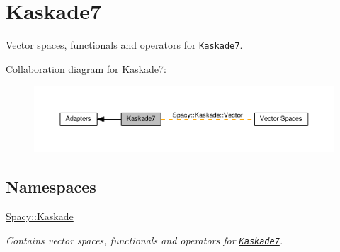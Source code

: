 \hypertarget{group__KaskadeGroup}{}\section{Kaskade7}
\label{group__KaskadeGroup}


Vector spaces, functionals and operators for \href{http://www.zib.de/projects/kaskade7-finite-element-toolbox}{\tt Kaskade7}.  


Collaboration diagram for Kaskade7\+:
\nopagebreak
\begin{figure}[H]
\begin{center}
\leavevmode
\includegraphics[width=350pt]{group__KaskadeGroup}
\end{center}
\end{figure}
\subsection*{Namespaces}
\begin{DoxyCompactItemize}
\item 
 \hyperlink{namespaceSpacy_1_1Kaskade}{Spacy\+::\+Kaskade}
\begin{DoxyCompactList}\small\item\em Contains vector spaces, functionals and operators for \href{http://www.zib.de/projects/kaskade7-finite-element-toolbox}{\tt Kaskade7}. \end{DoxyCompactList}\end{DoxyCompactItemize}
